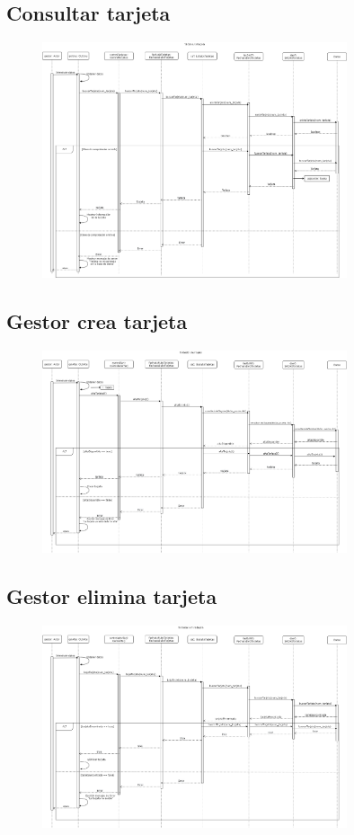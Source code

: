 \documentclass[12pt]{article}
\begin{document}
\subsection{Consultar tarjeta}
\begin{figure}[H]
    \centering
    \includegraphics[width=0.8\textwidth]{consultarTarjeta.png}
\end{figure}
\subsection{Gestor crea tarjeta}
\begin{figure}[H]
    \centering
    \includegraphics[width=0.8\textwidth]{14-Gestor_crea_tarjeta.png}
\end{figure}
\subsection{Gestor elimina tarjeta}
\begin{figure}[H]
    \centering
    \includegraphics[width=0.8\textwidth]{15-Gestor_elimina_tarjeta.png}
\end{figure}
\end{document}
